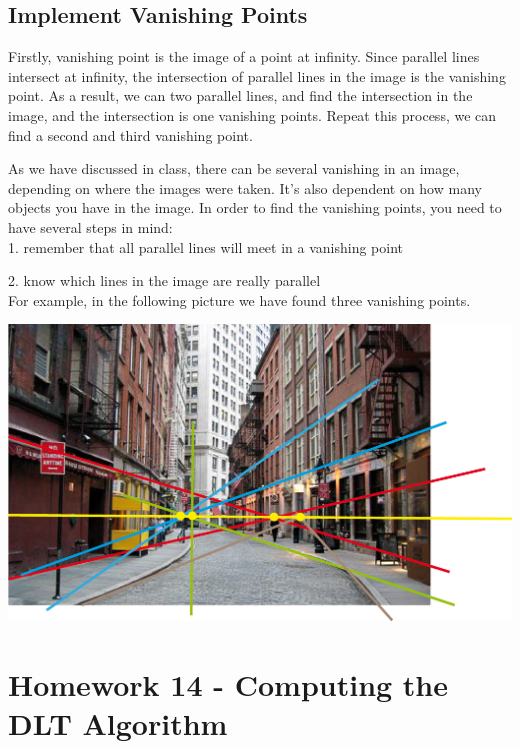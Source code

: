 \documentclass[]{article}
\begin{document}
\vspace{0.5em}


\subsection{Implement Vanishing Points}

Firstly, vanishing point is the image of a point at infinity. Since parallel lines intersect at infinity, the intersection of parallel lines in the image is the vanishing point. As a result, we can two parallel lines, and find the intersection in the image, and the intersection is one vanishing points. Repeat this process, we can find a second and third vanishing point.

As we have discussed in class, there can be several vanishing in an image, depending on where the images were taken. It's also dependent on how many objects you have in the image. In order to find the vanishing points, you need to have several steps in mind: \\

1. remember that all parallel lines will meet in a vanishing point

2. know which lines in the image are really parallel \\ 

For example, in the following picture we have found three vanishing points. 

\vspace{0.5em}

\centerline {
	\includegraphics[scale=0.4]{vanishing}
}

\section{Homework 14 - Computing the DLT Algorithm}
\end{document}
